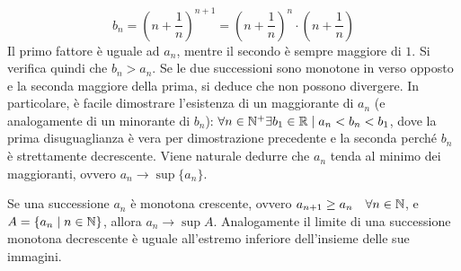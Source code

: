 \[
	b_n=\left(n+\frac{1}{n}\right)^{n+1}=\left(n+\frac{1}{n}\right)^n\cdot\left(n+\frac{1}{n}\right)
\]
Il primo fattore è uguale ad $a_n$, mentre il secondo è sempre maggiore di $1$. Si verifica quindi che $b_n>a_n$. Se le due successioni sono monotone in verso opposto e la seconda maggiore della prima, si deduce che non possono divergere. In particolare, è facile dimostrare l'esistenza di un maggiorante di $a_n$ (e analogamente di un minorante di $b_n$): $\forall n\in\mathbb{N}^+\exists b_1\in\mathbb{R}\mid a_n<b_n<b_1$, dove la prima disuguaglianza è vera per dimostrazione precedente e la seconda perché $b_n$ è strettamente decrescente. Viene naturale dedurre che $a_n$ tenda al minimo dei maggioranti, ovvero $a_n\to \sup\{a_n\}$.
\begin{teor}
	\label{suc:rego}
	Se una successione $a_n$ è monotona crescente, ovvero $a_{n+1}\geq a_n \quad\forall n\in\mathbb{N}$, e $A=\{a_n\mid n\in\mathbb{N}\}$, allora $a_n\to \sup A$. Analogamente il limite di una successione monotona decrescente è uguale all'estremo inferiore dell'insieme delle sue immagini.
\end{teor}
